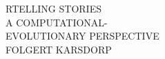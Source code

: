 

{       \centering
        \vspace*{1cm}
        
        {\sffamily\lsstyle\LARGE RTELLING STORIES}\\\vspace{1.5cm}
        {\sffamily\lsstyle\Large A COMPUTATIONAL- \vspace{0.5cm}\\EVOLUTIONARY PERSPECTIVE}\\\vspace{1.5cm}
        {\sffamily\lsstyle\normalsize FOLGERT KARSDORP}
        
        \vfill           
          \thispagestyle{empty}%
          \clearpage
}          
